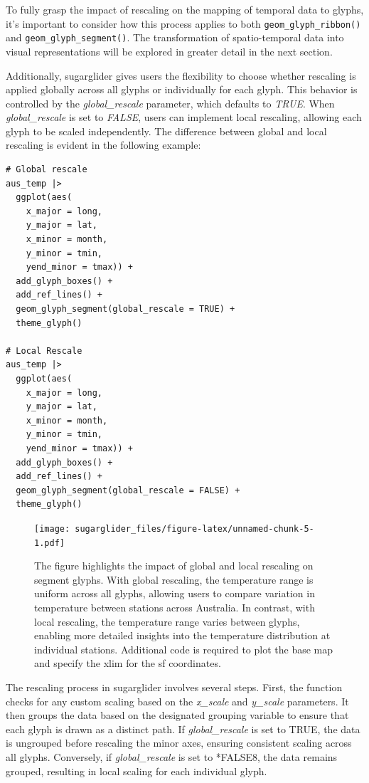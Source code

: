 To fully grasp the impact of rescaling on the mapping of temporal data to glyphs, it's important to consider how this process applies to both \texttt{geom\_glyph\_ribbon()} and \texttt{geom\_glyph\_segment()}. The transformation of spatio-temporal data into visual representations will be explored in greater detail in the next section.

Additionally, sugarglider gives users the flexibility to choose whether rescaling is applied globally across all glyphs or individually for each glyph. This behavior is controlled by the \emph{global\_rescale} parameter, which defaults to \emph{TRUE}. When \emph{global\_rescale} is set to \emph{FALSE}, users can implement local rescaling, allowing each glyph to be scaled independently. The difference between global and local rescaling is evident in the following example:

\begin{verbatim}
# Global rescale
aus_temp |>
  ggplot(aes(
    x_major = long, 
    y_major = lat, 
    x_minor = month, 
    y_minor = tmin, 
    yend_minor = tmax)) +
  add_glyph_boxes() +
  add_ref_lines() +
  geom_glyph_segment(global_rescale = TRUE) +
  theme_glyph()

# Local Rescale
aus_temp |>
  ggplot(aes(
    x_major = long, 
    y_major = lat, 
    x_minor = month, 
    y_minor = tmin, 
    yend_minor = tmax)) +
  add_glyph_boxes() +
  add_ref_lines() +
  geom_glyph_segment(global_rescale = FALSE) +
  theme_glyph()
\end{verbatim}

\begin{figure}
\centering
\texttt{[image: sugarglider\_files/figure-latex/unnamed-chunk-5-1.pdf]}
\caption{\label{fig:unnamed-chunk-5}The figure highlights the impact of global and local rescaling on segment glyphs. With global rescaling, the temperature range is uniform across all glyphs, allowing users to compare variation in temperature between stations across Australia. In contrast, with local rescaling, the temperature range varies between glyphs, enabling more detailed insights into the temperature distribution at individual stations. Additional code is required to plot the base map and specify the xlim for the sf coordinates.}
\end{figure}

The rescaling process in sugarglider involves several steps. First, the function checks for any custom scaling based on the \emph{x\_scale} and \emph{y\_scale} parameters. It then groups the data based on the designated grouping variable to ensure that each glyph is drawn as a distinct path. If \emph{global\_rescale} is set to TRUE, the data is ungrouped before rescaling the minor axes, ensuring consistent scaling across all glyphs. Conversely, if \emph{global\_rescale} is set to *FALSE8, the data remains grouped, resulting in local scaling for each individual glyph.

